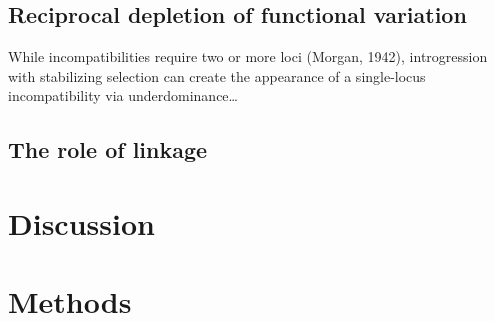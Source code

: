 \documentclass{article}
\begin{document}
\subsection{Reciprocal depletion of functional variation}

While incompatibilities require two or more loci (Morgan, 1942), introgression
with stabilizing selection can create the appearance of a single-locus
incompatibility via underdominance\dots

\subsection{The role of linkage}

\section{Discussion}

\section{Methods}
\end{document}
